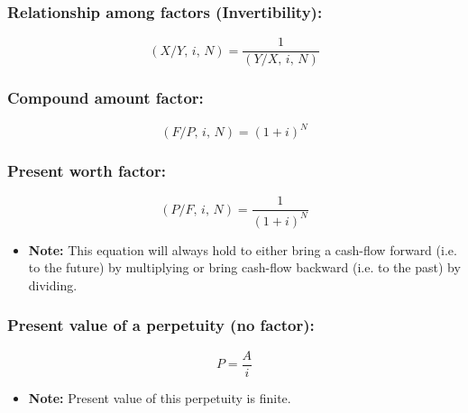     \subsubsection{Relationship among factors (Invertibility):}
    \begin{definition}
        \begin{equation}
            \left(X/Y, \, i, \, N\right) = \frac{1}{\left(Y/X, \, i, \, N\right)}
        \end{equation}
    \end{definition}

    \subsubsection{Compound amount factor:}
    \begin{definition}
        \begin{equation}
            \left(F/P, \, i, \, N\right) = (1+i)^N
        \end{equation}
    \end{definition}

    \subsubsection{Present worth factor:}
    \begin{definition}
        \begin{equation}
            \left(P/F, \, i, \, N\right) = \frac{1}{(1+i)^N}
        \end{equation}            
    \end{definition}

    \begin{intuition}
        \begin{itemize}
            \item \textbf{Note:} This equation will always hold to either bring a cash-flow forward (i.e. to the future) by multiplying or bring cash-flow backward (i.e. to the past) by dividing.
        \end{itemize}
    \end{intuition}

    \subsubsection{Present value of a perpetuity (no factor):}
    \begin{definition}
        \begin{equation}
            P = \frac{A}{i}
        \end{equation}
        \begin{itemize}
            \item \textbf{Note:} Present value of this perpetuity is finite.
        \end{itemize}
    \end{definition}

